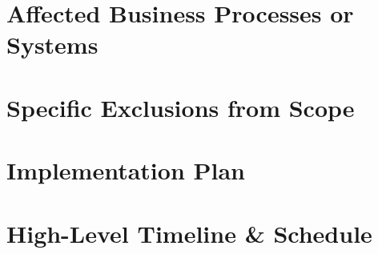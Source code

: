 \documentclass[a4paper]{article}
\begin{document}
\section{Affected Business Processes or Systems} %

\section{Specific Exclusions from Scope} %

\section{Implementation Plan} %

\section{High-Level Timeline \& Schedule} %
\end{document}
